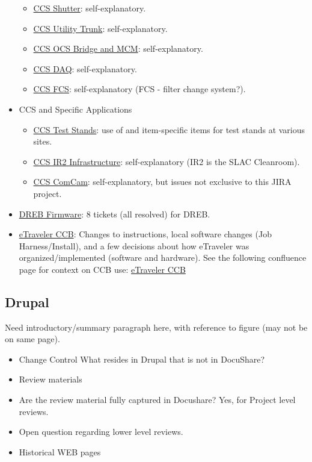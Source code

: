 \begin{itemize}
\begin{itemize}
		\item \href{https://jira.slac.stanford.edu/browse/LSSTCCSSHUTTER}{CCS Shutter}:  self-explanatory.
		\item \href{https://jira.slac.stanford.edu/browse/LSSTCCSUT}{CCS Utility Trunk}:  self-explanatory.
		\item \href{https://jira.slac.stanford.edu/browse/LCOBM}{CCS OCS Bridge and MCM}:  self-explanatory.
		\item \href{https://jira.slac.stanford.edu/browse/LSSTCCSDAQ}{CCS DAQ}:  self-explanatory.
		\item \href{https://jira.slac.stanford.edu/browse/LSSTCCSFCS}{CCS FCS}:  self-explanatory (FCS - filter change system?).	
	\end{itemize}
	\item CCS and Specific Applications
	\begin{itemize}
		\item \href{https://jira.slac.stanford.edu/browse/LSSTCCSTS}{CCS Test Stands}:  use of and item-specific items for test stands at various sites.
		\item \href{https://jira.slac.stanford.edu/browse/LSSTIR}{CCS IR2 Infrastructure}:  self-explanatory (IR2 is the SLAC Cleanroom).
		\item \href{https://jira.slac.stanford.edu/browse/LSSTCCSCOM}{CCS ComCam}:  self-explanatory, but issues not exclusive to this JIRA project.
	\end{itemize}
	\item \href{https://jira.slac.stanford.edu/browse/LSSTDREB}{DREB Firmware}:  8 tickets (all resolved) for DREB.
	\item \href{https://jira.slac.stanford.edu/browse/ETCCB}{eTraveler CCB}:  Changes to instructions, local software changes (Job Harness/Install), and a few decisions about how eTraveler was organized/implemented (software and hardware). See the following confluence page for context on CCB use: \href{https://confluence.slac.stanford.edu/display/LSSTCAM/eTraveler+CCB}{eTraveler CCB}
\end{itemize}

\subsection{Drupal}

Need introductory/summary paragraph here, with reference to figure (may not be on same page).

\begin{itemize}
	\item Change Control What resides in Drupal that is not in DocuShare?
	\item Review materials
	\item Are the review material fully captured in Docushare?  Yes, for Project level reviews.
	\item Open question regarding lower level reviews.
	\item Historical WEB pages
\end{itemize}

